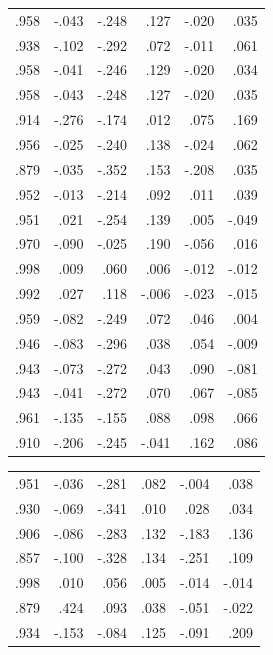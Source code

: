 \documentclass{mcmthesis}
\begin{document}
\begin{appendices}
\begin{table}[htbp]
\begin{tabular}{|r|r|r|r|r|r|}
    .958  & -.043 & -.248 & .127  & -.020 & .035 \\
    .938  & -.102 & -.292 & .072  & -.011 & .061 \\
    .958  & -.041 & -.246 & .129  & -.020 & .034 \\
    .958  & -.043 & -.248 & .127  & -.020 & .035 \\
    .914  & -.276 & -.174 & .012  & .075  & .169 \\
    .956  & -.025 & -.240 & .138  & -.024 & .062 \\
    .879  & -.035 & -.352 & .153  & -.208 & .035 \\
    .952  & -.013 & -.214 & .092  & .011  & .039 \\
    .951  & .021  & -.254 & .139  & .005  & -.049 \\
    .970  & -.090 & -.025 & .190  & -.056 & .016 \\
    .998  & .009  & .060  & .006  & -.012 & -.012 \\
    .992  & .027  & .118  & -.006 & -.023 & -.015 \\
    .959  & -.082 & -.249 & .072  & .046  & .004 \\
    .946  & -.083 & -.296 & .038  & .054  & -.009 \\
    .943  & -.073 & -.272 & .043  & .090  & -.081 \\
    .943  & -.041 & -.272 & .070  & .067  & -.085 \\
    .961  & -.135 & -.155 & .088  & .098  & .066 \\
    .910  & -.206 & -.245 & -.041 & .162  & .086 \\
    \end{tabular}%
  \label{tab:addlabel}%
\end{table}%
\begin{table}[htbp]
  \centering
    \begin{tabular}{|r|r|r|r|r|r|}
    .951  & -.036 & -.281 & .082  & -.004 & .038 \\
    .930  & -.069 & -.341 & .010  & .028  & .034 \\
    .906  & -.086 & -.283 & .132  & -.183 & .136 \\
    .857  & -.100 & -.328 & .134  & -.251 & .109 \\
    .998  & .010  & .056  & .005  & -.014 & -.014 \\
    .879  & .424  & .093  & .038  & -.051 & -.022 \\
    .934  & -.153 & -.084 & .125  & -.091 & .209 \\

\end{tabular}
\end{table}
\end{appendices}
\end{document}
